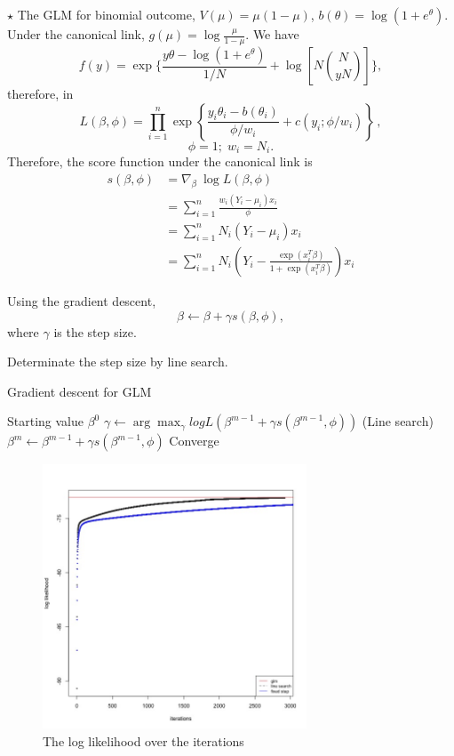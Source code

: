 \documentclass[11pt]{article}
\newcommand{\jie}{$\star$ }
\begin{document}
\begin{enumerate}[(A)]
\bigskip
\jie
The GLM for binomial outcome, $V(\mu) = \mu(1-\mu)$, $b(\theta) = \log(1+e^\theta)$.
Under the canonical link, $g(\mu) = \log \frac{\mu}{1-\mu}$.
We have $$f(y) = \exp \{\frac{y \theta - \log (1+e^\theta)}{1/N} + \log\left[N{N \choose yN}\right]\},$$
therefore, in 
$$
L(\beta, \phi) = \prod_{i=1}^n \exp \left\{ \frac{y_i \theta_i - b(\theta_i)}{\phi/w_i} + c(y_i; \phi/w_i)   \right \} \, ,
$$
$$\phi = 1; \; w_i = N_i.$$
Therefore, the score function under the canonical link is
\begin{align*}
    s(\beta, \phi) &= \nabla_\beta \  \log L(\beta, \phi) \\
    &= \sum_{i=1}^n \frac{w_i(Y_i - \mu_i) x_i}{ \phi} \\
    & = \sum_{i=1}^n N_i (Y_i - \mu_i) x_i \\
    &= \sum_{i=1}^n N_i \left(Y_i - \frac{\exp(x_i^T\beta)}{1+\exp(x_i^T\beta)} \right) x_i
\end{align*}

Using the gradient descent,
$$ \beta \leftarrow \beta + \gamma s(\beta, \phi),$$
where $\gamma$ is the step size.

Determinate the step size by line search.
\begin{algorithm}
\begin{algorithmic}
\caption{Gradient descent for GLM}
\Require Starting value $\beta^0$
    \State $\gamma \leftarrow \arg \max_\gamma logL(\beta^{m-1} + \gamma s(\beta^{m-1}, \phi))$ (Line search) 
    \State $ \beta^{m} \leftarrow \beta^{m-1} + \gamma s(\beta^{m-1}, \phi)$
    \State Converge
    \EndIf
\EndWhile
\end{algorithmic}
\end{algorithm}

\begin{figure}[h]
    \centering
    \includegraphics[width=0.7\textwidth]{figures/logl.jpg}
    \caption{The log likelihood over the iterations}
    \label{fig:logl_GD}
    \end{figure}



\end{enumerate}
\end{document}
